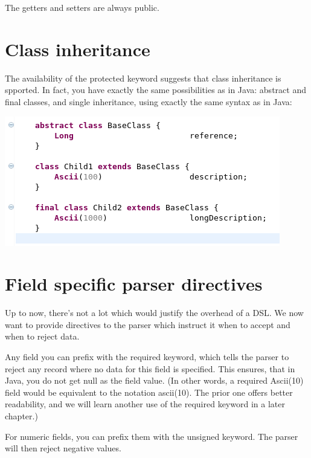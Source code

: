 \documentclass[11pt,a4paper,oneside]{article}
\begin{document}
\noindent The getters and setters are always public.

\section{Class inheritance}
The availability of the {\ttfamily protected} keyword suggests that class inheritance is spported. In fact, you have exactly the same
possibilities as in Java: abstract and final classes, and single inheritance, using exactly the same syntax as in Java:
 

\vspace{2mm}
\hspace{1cm}\includegraphics[scale=0.5]{images/tut1-007.png}


\section{Field specific parser directives}
Up to now, there's not a lot which would justify the overhead of a DSL.  
We now want to provide directives to the parser which instruct it when to accept and when to reject data. 

Any field you can prefix with the {\ttfamily required} keyword, which tells the parser to reject any record where no data for this field is specified.
This ensures, that in Java, you do not get {\ttfamily null} as the field value. (In other words, a {\ttfamily required
Ascii(10)} field would be equivalent to the notation {\ttfamily ascii(10)}.
The prior one offers better readability, and we will learn another use of the {\ttfamily required} keyword in a later chapter.)

For numeric fields, you can prefix them with the {\ttfamily unsigned} keyword. The parser will then reject negative values.
\end{document}
